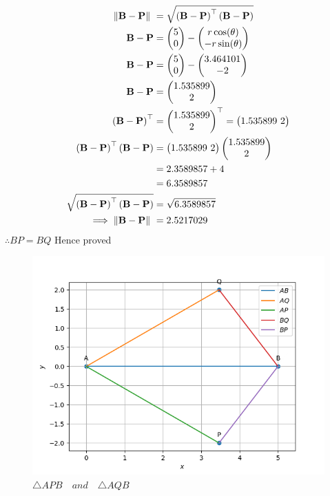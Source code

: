 \documentclass[11pt]{book}
\begin{document}
\begin{enumerate}
\begin{enumerate}
\begin{align}
\norm{\vec{B}-\vec{P}}\ &=  \sqrt{\brak{\vec{B}-\vec{P}}^{\top}\brak{\vec{B}-\vec{P}}} \\
\vec{B}-\vec{P} &= \myvec{5 \\ 0} - \myvec{r\cos(\theta) \\ -r\sin(\theta)} \\
\vec{B}-\vec{P} &= \myvec{5 \\ 0} - \myvec{3.464101 \\ -2} \\
\vec{B}-\vec{P} &= \myvec{1.535899 \\ 2} \\
\brak{\vec{B}-\vec{P}}^{\top} &= {\myvec{1.535899 \\ 2}}^{\top} = \myvec{1.535899 \ 2} \\
\brak{\vec{B}-\vec{P}}^{\top}\brak{\vec{B}-\vec{P}} &= \myvec{1.535899 \ 2} \myvec{1.535899 \\ 2}\\
&= 2.3589857 + 4 \\
&= 6.3589857 \\  
\sqrt{\brak{\vec{B}-\vec{P}}^{\top}\brak{\vec{B}-\vec{P}}} &= \sqrt{6.3589857}	\\
\implies \norm{\vec{B}-\vec{P}}\ &= 2.5217029 
\end{align}
$\therefore  BP = BQ $ \hspace{12pt} Hence proved

\begin{figure}[H]
    \centering
    \includegraphics[width=\columnwidth]{fig_mat_comp.png}
    \caption{$\triangle APB \hspace{12pt} and \hspace{12pt} \triangle AQB$}
\end{figure}
\end{enumerate}
\end{enumerate}
%
\end{document}
